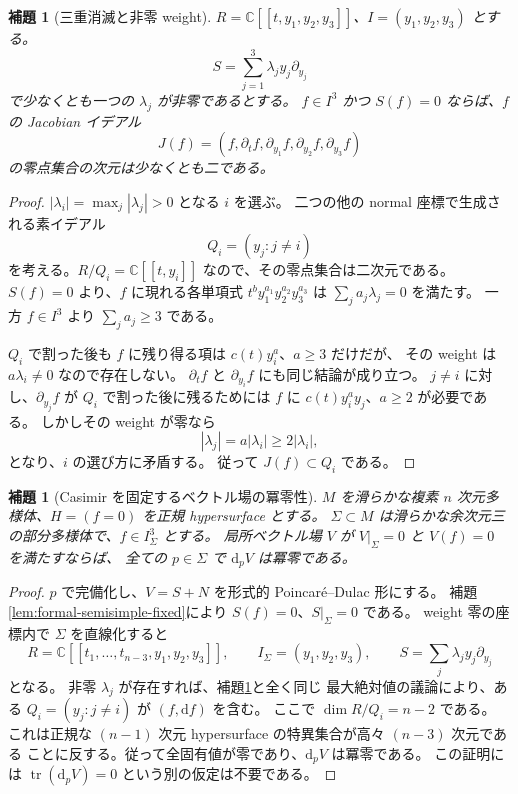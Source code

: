 \documentclass[11pt,a4paper]{ltjsarticle}
\newtheorem{lemma}[theorem]{補題}
\theoremstyle{remark}\newtheorem{remark}[theorem]{注意}
\begin{document}
\begin{lemma}[三重消滅と非零 weight]
\label{lem:maximum-weight}
$R=\mathbb C[[t,y_1,y_2,y_3]]$、$I=(y_1,y_2,y_3)$ とする。
\[
             S=\sum_{j=1}^3\lambda_j y_j\partial_{y_j}
\]
で少なくとも一つの $\lambda_j$ が非零であるとする。
$f\in I^3$ かつ $S(f)=0$ ならば、$f$ の Jacobian イデアル
\[
             J(f)=(f,\partial_t f,\partial_{y_1}f,
                         \partial_{y_2}f,\partial_{y_3}f)
\]
の零点集合の次元は少なくとも二である。
\end{lemma}
\begin{proof}
$|\lambda_i|=\max_j|\lambda_j|>0$ となる $i$ を選ぶ。
二つの他の normal 座標で生成される素イデアル
\[
                        Q_i=(y_j:j\ne i)
\]
を考える。$R/Q_i=\mathbb C[[t,y_i]]$ なので、その零点集合は二次元である。
$S(f)=0$ より、$f$ に現れる各単項式
$t^b y_1^{a_1}y_2^{a_2}y_3^{a_3}$ は
$\sum_j a_j\lambda_j=0$ を満たす。
一方 $f\in I^3$ より $\sum_j a_j\ge3$ である。

$Q_i$ で割った後も $f$ に残り得る項は $c(t)y_i^a$、$a\ge3$ だけだが、
その weight は $a\lambda_i\ne0$ なので存在しない。
$\partial_t f$ と $\partial_{y_i}f$ にも同じ結論が成り立つ。
$j\ne i$ に対し、$\partial_{y_j}f$ が $Q_i$ で割った後に残るためには
$f$ に $c(t)y_i^a y_j$、$a\ge2$ が必要である。
しかしその weight が零なら
\[
                       |\lambda_j|=a|\lambda_i|
                                      \ge2|\lambda_i|,
\]
となり、$i$ の選び方に矛盾する。
従って $J(f)\subset Q_i$ である。
\end{proof}



\begin{lemma}[Casimir を固定するベクトル場の冪零性]
\label{lem:casimir-nilpotent}
$M$ を滑らかな複素 $n$ 次元多様体、$H=(f=0)$ を正規 hypersurface とする。
$\Sigma\subset M$ は滑らかな余次元三の部分多様体で、$f\in I_\Sigma^3$ とする。
局所ベクトル場 $V$ が $V|_\Sigma=0$ と $V(f)=0$ を満たすならば、
全ての $p\in\Sigma$ で $\mathrm d_pV$ は冪零である。
\end{lemma}
\begin{proof}
$p$ で完備化し、$V=S+N$ を形式的 Poincar\'e--Dulac 形にする。
補題\ref{lem:formal-semisimple-fixed}により $S(f)=0$、$S|_\Sigma=0$ である。
weight 零の座標内で $\Sigma$ を直線化すると
\[
 R=\mathbb C[[t_1,\ldots,t_{n-3},y_1,y_2,y_3]],\qquad
 I_\Sigma=(y_1,y_2,y_3),\qquad
 S=\sum_j\lambda_jy_j\partial_{y_j}
\]
となる。
非零 $\lambda_j$ が存在すれば、補題\ref{lem:maximum-weight}と全く同じ
最大絶対値の議論により、ある
$Q_i=(y_j:j\ne i)$ が $(f,\mathrm df)$ を含む。
ここで $\dim R/Q_i=n-2$ である。
これは正規な $(n-1)$ 次元 hypersurface の特異集合が高々 $(n-3)$ 次元である
ことに反する。従って全固有値が零であり、$\mathrm d_pV$ は冪零である。
この証明には $\operatorname{tr}(\mathrm d_pV)=0$ という別の仮定は不要である。
\end{proof}
\end{document}
